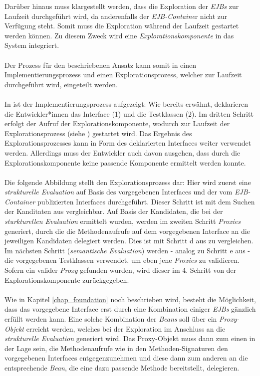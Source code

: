 Darüber hinaus muss klargestellt werden, dass die Exploration der \emph{EJBs} zur Laufzeit durchgeführt wird, da anderenfalls der \emph{EJB-Containe}r nicht zur Verfügung steht. Somit muss die Exploration während der Laufzeit gestartet werden können. Zu diesem Zweck wird eine \emph{Explorationskomponente} in das System integriert. 
\\\\
Der Prozess für den beschriebenen Ansatz kann somit in einen Implementierungsprozess und einen Explorationsprozess, welcher zur Laufzeit durchgeführt wird, eingeteilt werden.
\\\\
In  ist der Implementierungsprozess aufgezeigt:
\noindent
Wie bereits erwähnt, deklarieren die Entwickler*innen das \Gls{Interface} (1) und die Testklassen (2). Im dritten Schritt erfolgt der Aufruf der Explorationskomponente, wodurch zur Laufzeit der Explorationsprozess (siehe ) gestartet wird. Das Ergebnis des Explorationsprozesses kann in Form des deklarierten \Gls{Interface}s weiter verwendet werden. Allerdings muss der Entwickler auch davon ausgehen, dass durch die Explorationskomponente keine passende Komponente ermittelt werden konnte.
\\\\
Die folgende Abbildung stellt den Explorationsprozess dar:
\noindent
Hier wird zuerst eine \emph{strukturelle Evaluation} auf Basis des vorgegebenen \Gls{Interface}s und der vom \emph{EJB-Container} publizierten \Gls{Interface}s durchgeführt. 
Dieser Schritt ist mit dem Suchen der Kanditaten aus  vergleichbar. Auf Basis der Kandidaten, die bei der \emph{sturkturellen Evaluation} ermittelt wurden, werden im zweiten Schritt \emph{Proxies} generiert, durch die die Methodenaufrufe auf dem vorgegebenen \Gls{Interface} an die jeweiligen Kandidaten delegiert werden. Dies ist mit Schritt d aus  zu vergleichen. Im nächsten Schritt (\emph{semantische Evaluation}) werden - analog zu Schritt e aus  - die vorgegebenen Testklassen verwendet, um eben jene \emph{Proxies} zu validieren. Sofern ein valider \emph{Proxy} gefunden wurden, wird dieser im 4. Schritt von der Explorationskomponente zurückgegeben.
\\\\
Wie in Kapitel \ref{chap_foundation} noch beschrieben wird, besteht die Möglichkeit, dass das vorgegebene \Gls{Interface} erst durch eine Kombination einiger \emph{EJBs} gänzlich erfüllt werden kann. Eine solche Kombination der \emph{Beans} soll über ein \emph{Proxy-Objekt} erreicht werden, welches bei der Exploration im Anschluss an die \emph{strukturelle Evaluation} generiert wird. Das Proxy-Objekt muss dann zum einen in der Lage sein, die Methodenaufrufe wie in den Methoden-Signaturen den vorgegebenen \Gls{Interface}s entgegenzunehmen und diese dann zum anderen an die entsprechende \emph{Bean}, die eine dazu passende Methode bereitstellt, delegieren.

